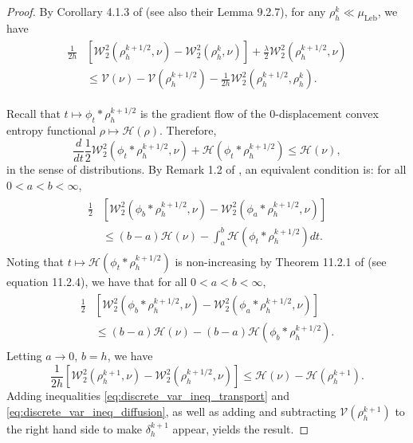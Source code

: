 \documentclass[final,12pt]{colt2018}
\newcommand{\was}{\mathcal{W}}
\begin{document}
\begin{proof}
By Corollary 4.1.3 of \citet{ambrosio2005} (see also their Lemma 9.2.7), for any $\rho_{h}^k \ll \mu_{\text{Leb}}$, we have 
\begin{align}\label{eq:discrete_var_ineq_transport}
\begin{split}
\frac{1}{2h}&\left[ \was_2^2(\rho_{h}^{k+1/2},\nu) - \was_2^2(\rho_{h}^{k},\nu) \right] +\frac{\lambda}{2}\was_2^2(\rho_h^{k+1/2},\nu)\\
&\leq \mathcal{V}(\nu) - \mathcal{V}(\rho_{h}^{k+1/2}) - \frac{1}{2h} \was_2^2(\rho_{h}^{k+1/2},\rho_{h}^{k}).
\end{split}
\end{align}

Recall that $t \mapsto \phi_t * \rho_{h}^{k+1/2}$ is the gradient flow of the 0-displacement convex entropy functional $\rho\mapsto\mathcal{H}(\rho)$. Therefore,
\begin{equation}
\frac{d}{dt} \frac{1}{2} \was_2^2(\phi_t * \rho_{h}^{k+1/2},\nu) + \mathcal{H}(\phi_t * \rho_{h}^{k+1/2}) \leq \mathcal{H}(\nu),
\end{equation}
in the sense of distributions. By Remark 1.2 of \citet{clement2011trotter}, an equivalent condition is: for all $0 < a < b< \infty$,
\begin{align}
\begin{split}
\frac{1}{2}&\left[ \was_2^2(\phi_b * \rho_{h}^{k+1/2},\nu) - \was_2^2(\phi_a* \rho_{h}^{k+1/2},\nu) \right] \\
&\leq (b-a)\mathcal{H}(\nu) - \int_a^b \mathcal{H}(\phi_t * \rho_{h}^{k+1/2}) dt.
\end{split}
\end{align}
Noting that $t \mapsto \mathcal{H}(\phi_t * \rho_{h}^{k+1/2})$ is non-increasing by Theorem 11.2.1 of \citet{ambrosio2005} (see equation 11.2.4), we have that for all $0 < a < b< \infty$,
\begin{align}
\begin{split}
\frac{1}{2}&\left[ \was_2^2(\phi_b * \rho_{h}^{k+1/2},\nu) - \was_2^2(\phi_a* \rho_{h}^{k+1/2},\nu) \right] \\
&\leq (b-a)\mathcal{H}(\nu) -  (b-a)\mathcal{H}(\phi_b * \rho_{h}^{k+1/2}).
\end{split}
\end{align}
Letting $a \to 0$, $b = h$, we have
\begin{equation}\label{eq:discrete_var_ineq_diffusion}
\frac{1}{2h}\left[ \was_2^2(\rho_{h}^{k+1},\nu) - \was_2^2(\rho_{h}^{k+1/2},\nu) \right] \leq \mathcal{H}(\nu) - \mathcal{H}(\rho_{h}^{k+1}).
\end{equation}
Adding inequalities \eqref{eq:discrete_var_ineq_transport} and \eqref{eq:discrete_var_ineq_diffusion}, as well as adding and subtracting $\mathcal{V}(\rho_{h}^{k+1})$ to the right hand side to make $\delta_{h}^{k+1}$ appear, yields the result.
\end{proof}
\end{document}
